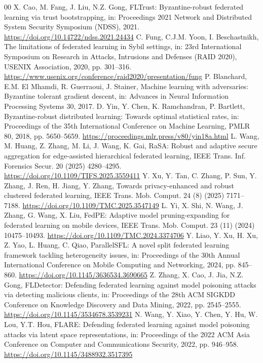 \documentclass[final,5p,times,twocolumn]{elsarticle/elsarticle}
\begin{document}
\begin{thebibliography}{00}
     X. Cao, M. Fang, J. Liu, N.Z. Gong, FLTrust: Byzantine-robust federated learning via trust bootstrapping, in: Proceedings 2021 Network and Distributed System Security Symposium (NDSS), 2021. \url{https://doi.org/10.14722/ndss.2021.24434}
     C. Fung, C.J.M. Yoon, I. Beschastnikh, The limitations of federated learning in Sybil settings, in: 23rd International Symposium on Research in Attacks, Intrusions and Defenses (RAID 2020), USENIX Association, 2020, pp. 301--316. \url{https://www.usenix.org/conference/raid2020/presentation/fung}
     P. Blanchard, E.M. El Mhamdi, R. Guerraoui, J. Stainer, Machine learning with adversaries: Byzantine tolerant gradient descent, in: Advances in Neural Information Processing Systems 30, 2017.
     D. Yin, Y. Chen, K. Ramchandran, P. Bartlett, Byzantine-robust distributed learning: Towards optimal statistical rates, in: Proceedings of the 35th International Conference on Machine Learning, PMLR 80, 2018, pp. 5650--5659. \url{https://proceedings.mlr.press/v80/yin18a.html}
     L. Wang, M. Huang, Z. Zhang, M. Li, J. Wang, K. Gai, RaSA: Robust and adaptive secure aggregation for edge-assisted hierarchical federated learning, IEEE Trans. Inf. Forensics Secur. 20 (2025) 4280--4295. \url{https://doi.org/10.1109/TIFS.2025.3559411}
     Y. Xu, Y. Tan, C. Zhang, P. Sun, Y. Zhang, J. Ren, H. Jiang, Y. Zhang, Towards privacy-enhanced and robust clustered federated learning, IEEE Trans. Mob. Comput. 24 (8) (2025) 7171--7188. \url{https://doi.org/10.1109/TMC.2025.3547149}
     L. Yi, X. Shi, N. Wang, J. Zhang, G. Wang, X. Liu, FedPE: Adaptive model pruning-expanding for federated learning on mobile devices, IEEE Trans. Mob. Comput. 23 (11) (2024) 10475--10493. \url{https://doi.org/10.1109/TMC.2024.3374706}
     Y. Liao, Y. Xu, H. Xu, Z. Yao, L. Huang, C. Qiao, ParallelSFL: A novel split federated learning framework tackling heterogeneity issues, in: Proceedings of the 30th Annual International Conference on Mobile Computing and Networking, 2024, pp. 845--860. \url{https://doi.org/10.1145/3636534.3690665}
     Z. Zhang, X. Cao, J. Jia, N.Z. Gong, FLDetector: Defending federated learning against model poisoning attacks via detecting malicious clients, in: Proceedings of the 28th ACM SIGKDD Conference on Knowledge Discovery and Data Mining, 2022, pp. 2545--2555. \url{https://doi.org/10.1145/3534678.3539231}
     N. Wang, Y. Xiao, Y. Chen, Y. Hu, W. Lou, Y.T. Hou, FLARE: Defending federated learning against model poisoning attacks via latent space representations, in: Proceedings of the 2022 ACM Asia Conference on Computer and Communications Security, 2022, pp. 946--958. \url{https://doi.org/10.1145/3488932.3517395}

\end{thebibliography}
\end{document}

